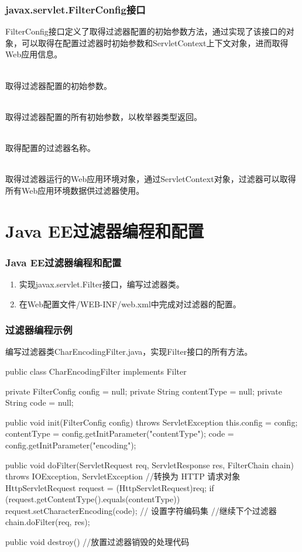 \begin{frame}[fragile] %
\frametitle{javax.servlet.FilterConfig接口} 

FilterConfig接口定义了取得过滤器配置的初始参数方法，通过实现了该接口的对象，可以取得在配置过滤器时初始参数和ServletContext上下文对象，进而取得Web应用信息。

 \\取得过滤器配置的初始参数。

 \\取得过滤器配置的所有初始参数，以枚举器类型返回。

 \\取得配置的过滤器名称。

 \\取得过滤器运行的Web应用环境对象，通过ServletContext对象，过滤器可以取得所有Web应用环境数据供过滤器使用。
\end{frame}

\section{Java EE过滤器编程和配置}

\begin{frame}[fragile] %
\frametitle{Java EE过滤器编程和配置}
\begin{enumerate}
\item 实现javax.servlet.Filter接口，编写过滤器类。
\item 在Web配置文件/WEB-INF/web.xml中完成对过滤器的配置。
\end{enumerate}
\end{frame}

\begin{frame}[fragile] %
\frametitle{过滤器编程示例} 

编写过滤器类CharEncodingFilter.java，实现Filter接口的所有方法。

\begin{javaCode}
public class CharEncodingFilter implements Filter {
  private FilterConfig config = null;
  private String contentType = null;
  private String code = null;

  public void init(FilterConfig config) throws ServletException {
    this.config = config;
    contentType = config.getInitParameter("contentType");
    code = config.getInitParameter("encoding");
  }

  public void doFilter(ServletRequest req, ServletResponse res, FilterChain chain) 
  throws IOException, ServletException {
    //转换为 HTTP 请求对象
    HttpServletRequest request = (HttpServletRequest)req;
    if (request.getContentType().equals(contentType)) {
      request.setCharacterEncoding(code); // 设置字符编码集
    }
    //继续下个过滤器
    chain.doFilter(req, res);
  }

  public void destroy() {
    //放置过滤器销毁的处理代码
  }
}
\end{javaCode}
\end{frame}

